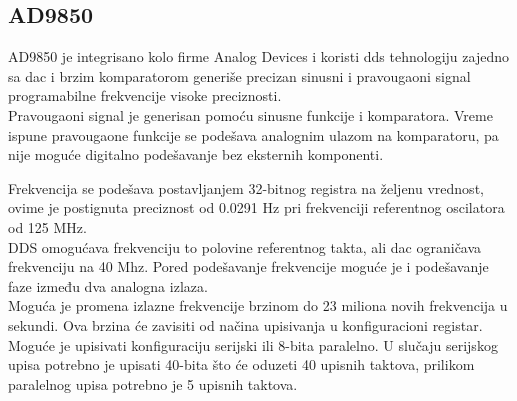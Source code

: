 \subsection{AD9850}

AD9850 je integrisano kolo firme Analog Devices i koristi \gls{dds} tehnologiju
zajedno sa \gls{dac} i brzim komparatorom generiše precizan sinusni i
pravougaoni signal programabilne frekvencije visoke preciznosti. \\
Pravougaoni signal je generisan pomoću sinusne funkcije i komparatora.
Vreme ispune pravougaone funkcije se podešava analognim ulazom na komparatoru,
pa nije moguće digitalno podešavanje bez eksternih komponenti. \\

\begin{figure}[H]
\end{figure}

Frekvencija se podešava postavljanjem 32-bitnog registra na željenu vrednost,
ovime je postignuta preciznost od 0.0291 Hz pri frekvenciji referentnog oscilatora od 125
MHz. \\
\gls{DDS} omogućava frekvenciju to polovine referentnog takta, ali \gls{dac}
ograničava frekvenciju na 40 Mhz.
Pored podešavanje frekvencije moguće je i podešavanje faze između dva analogna
izlaza. \\

Moguća je promena izlazne frekvencije brzinom do 23 miliona
novih frekvencija u sekundi.
Ova brzina će zavisiti od načina upisivanja u konfiguracioni registar.
Moguće je upisivati konfiguraciju serijski ili 8-bita paralelno.
U slučaju serijskog upisa potrebno je upisati 40-bita što će oduzeti 40 upisnih
taktova, prilikom paralelnog upisa potrebno je 5 upisnih taktova. \\

